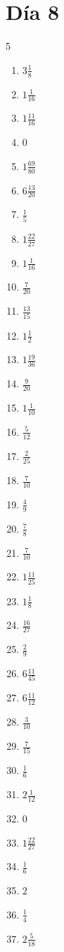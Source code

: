 \documentclass[12pt]{article}
\begin{document}
\section*{Día 8}
\begin{multicols}{5}\begin{enumerate}
\item $ 3 \frac{1}{8} $
\item $ 1 \frac{1}{16} $
\item $ 1 \frac{11}{16} $
\item $ 0 $
\item $ 1 \frac{69}{80} $
\item $ 6 \frac{13}{20} $
\item $ \frac{1}{5} $
\item $ 1 \frac{22}{27} $
\item $ 1 \frac{1}{16} $
\item $ \frac{7}{20} $
\item $ \frac{13}{15} $
\item $ 1 \frac{1}{2} $
\item $ 1 \frac{19}{36} $
\item $ \frac{9}{20} $
\item $ 1 \frac{1}{10} $
\item $ \frac{5}{12} $
\item $ \frac{2}{25} $
\item $ \frac{7}{10} $
\item $ \frac{4}{9} $
\item $ \frac{7}{8} $
\item $ \frac{7}{10} $
\item $ 1 \frac{11}{25} $
\item $ 1 \frac{1}{8} $
\item $ \frac{16}{27} $
\item $ \frac{2}{9} $
\item $ 6 \frac{11}{45} $
\item $ 6 \frac{11}{12} $
\item $ \frac{3}{10} $
\item $ \frac{7}{15} $
\item $ \frac{1}{6} $
\item $ 2 \frac{1}{12} $
\item $ 0 $
\item $ 1 \frac{22}{27} $
\item $ \frac{1}{6} $
\item $ 2 $
\item $ \frac{1}{4} $
\item $ 2 \frac{5}{18} $

\end{enumerate}
\end{multicols}
\end{document}
